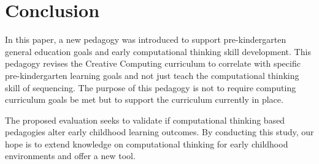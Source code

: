 \documentclass[11pt, letterpaper, onecolumn]{article}
\begin{document}
\section{Conclusion}
%
In this paper, a new pedagogy was introduced to support pre-kindergarten general education goals and early computational thinking skill development.
%
This pedagogy revises the Creative Computing curriculum to correlate with  specific pre-kindergarten learning goals and not just teach the computational thinking skill of sequencing.
%
The purpose of this pedagogy is not to require computing curriculum goals be met but to support the curriculum currently in place.

%
The proposed evaluation seeks to validate if computational thinking based pedagogies alter early childhood learning outcomes.
%
By conducting this study, our hope is to extend knowledge on computational thinking for early childhood environments and offer a new tool.
%







\end{document}
